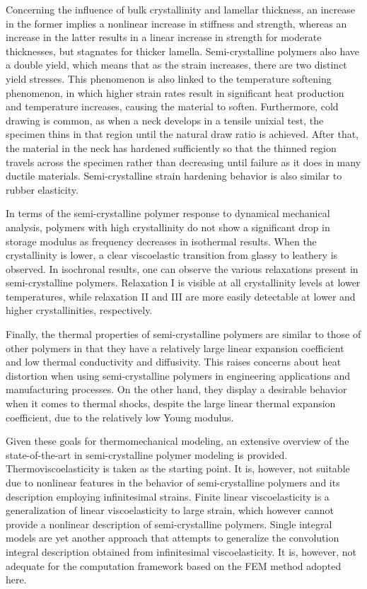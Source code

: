 Concerning the influence of bulk crystallinity and lamellar thickness, an increase in the former implies a nonlinear increase in stiffness and strength, whereas an increase in the latter results in a linear increase in strength for moderate thicknesses, but stagnates for thicker lamella.
Semi-crystalline polymers also have a double yield, which means that as the strain increases, there are two distinct yield stresses.
This phenomenon is also linked to the temperature softening phenomenon, in which higher strain rates result in significant heat production and temperature increases, causing the material to soften.
Furthermore, cold drawing is common, as when a neck develops in a tensile unixial test, the specimen thins in that region until the natural draw ratio is achieved.
After that, the material in the neck has hardened sufficiently so that the thinned region travels across the specimen rather than decreasing until failure as it does in many ductile materials.
Semi-crystalline strain hardening behavior is also similar to rubber elasticity.

In terms of the semi-crystalline polymer response to dynamical mechanical analysis, polymers with high crystallinity do not show a significant drop in storage modulus as frequency decreases in isothermal results.
When the crystallinity is lower, a clear viscoelastic transition from glassy to leathery is observed.
In isochronal results, one can observe the various relaxations present in semi-crystalline polymers.
Relaxation I is visible at all crystallinity levels at lower temperatures, while relaxation II and III are more easily detectable at lower and higher crystallinities, respectively.

Finally, the thermal properties of semi-crystalline polymers are similar to those of other polymers in that they have a relatively large linear expansion coefficient and low thermal conductivity and diffusivity.
This raises concerns about heat distortion when using semi-crystalline polymers in engineering applications and manufacturing processes.
On the other hand, they display a desirable behavior when it comes to thermal shocks, despite the large linear thermal expansion coefficient, due to the relatively low Young modulus.
\enlargethispage{\baselineskip}

Given these goals for thermomechanical modeling, an extensive overview of the state-of-the-art in semi-crystalline polymer modeling is provided.
Thermoviscoelasticity is taken as the starting point.
It is, however, not suitable due to nonlinear features in the behavior of semi-crystalline polymers and its description employing infinitesimal strains.
Finite linear viscoelasticity is a generalization of linear viscoelasticity to large strain, which however cannot provide a nonlinear description of semi-crystalline polymers.
Single integral models are yet another approach that attempts to generalize the convolution integral description obtained from infinitesimal viscoelasticity.
It is, however, not adequate for the computation framework based on the FEM method adopted here.

